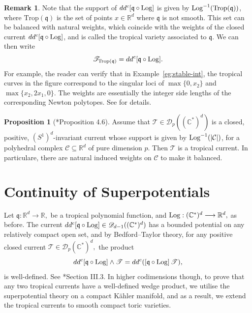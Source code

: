 \documentclass[11pt]{amsart}
\def\Log{{\rm Log}}
\theoremstyle{definition}
\newtheorem{definition}[theorem]{Definition}
\newtheorem{proposition}[theorem]{Proposition}
\newtheorem{remark}[theorem]{Remark}
\newcommand{\R}{\mathbb{R}}
\newcommand{\lto}{\longrightarrow}
\newcommand{\C}{\mathbb{C}}
\newcommand{\cD}{\mathcal{D}}
\newcommand{\sD}{\mathscr{D}}
\newcommand{\cC}{\mathcal{C}}
\newcommand{\sT}{\mathscr{T}}
\newcommand{\fq}{\mathfrak{q}}
\newcommand{\Trop}{\mathrm{Trop}}
\begin{document}
\begin{remark}\label{rem:trop-hyper-def}
Note that the support of \(dd^c [\fq \circ \Log]\) is given by \(\Log^{-1}(\Trop(\fq))\), where \(\Trop(\fq)\) is the set of points \(x \in \R^d\) where \(\fq\) is not smooth. This set can be balanced with natural weights, which coincide with the weights of the closed current \(dd^c [\fq \circ \Log]\), and is called the tropical variety associated to \(\fq\). We can then write
\[
\sT_{\Trop(\fq)} = dd^c [\fq \circ \Log].
\]
For example, the reader can verify that in Example~\ref{eg:stable-int}, the tropical curves in the figure correspond to the singular loci of \(\max\{0, x_2\}\) and \(\max\{x_2, 2x_1, 0\}\). The weights are essentially the integer side lengths of the corresponding Newton polytopes. See \cite{Maclagan-Sturmfels} for details.
\end{remark}

\begin{proposition}[\cite{Dyn-trop}*{Proposition 4.6}]
Assume that \(\sT \in \cD_{p}((\C^*)^d)\) is a closed, positive, \((S^1)^d\)-invariant current whose support is given by \(\Log^{-1}(|\cC|)\), for a polyhedral complex \(\cC \subseteq \R^d\) of pure dimension \(p\). Then \(\sT\) is a tropical current. In particulare, there are natural induced weights on $\cC$ to make it balanced.
\end{proposition}

    

\section{Continuity of Superpotentials}


Let $\fq:\R^d \lto \R,$ be a tropical polynomial function, and $\Log: (\C^*)^d \lto \R^d,$ as before. The current $dd^c [\fq \circ \Log] \in \sD_{d-1} ((\C^*)^d)$ has a bounded potential on any relatively compact open set, and by Bedford--Taylor theory, for any positive closed current $\sT \in \sD_{p} (\C^*)^d,$  the product 
$$
dd^c [ \fq \circ \Log] \wedge \sT = dd^c ([\fq\circ \Log] \, \sT),
$$
is well-defined. See \cite{DemaillyBook1}*{Section III.3}. In higher codimensions though, to prove that any two tropical currents have a well-defined wedge product, we utilise the superpotential theory \cite{Dinh-Sibony:superpot} on a compact K\"ahler manifold, and as a result, we extend the tropical currents to smooth compact toric varieties. 
\end{document}
